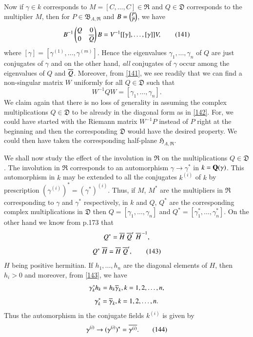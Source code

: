 Now if $\gamma\in k$ corresponds to $M=[C,\ldots,C]\in\mathfrak{R}$
and $Q\in\mathfrak{D}$ corresponds to the multiplier $M$, then for
$P\in\mathfrak{B}_{A,\mathfrak{R}}$ and $B=\binom{P}{\overline{P}}$, we have
\begin{equation*}
B^{-1}
\begin{pmatrix}
Q &  0\\
0 & \overline{Q}
\end{pmatrix}
B=V^{-1}[[\gamma],\ldots,[\gamma]]V,\tag{141}\label{141}
\end{equation*}
where $[\gamma]=[\gamma^{(1)},\ldots,\gamma^{(m)}]$. Hence the
eigenvalues $\gamma_{1},\ldots,\gamma_{n}$ of $Q$ are just conjugates
of $\gamma$ and on the other hand, {\em all} conjugates of $\gamma$
occur among the eigenvalues of $Q$ and $\overline{Q}$. Moreover, from
\eqref{141}, we see readily that we can find a non-singular matrix $W$
uniformly for all $Q\in\mathfrak{D}$ such that
\begin{equation*}
W^{-1}QW=[\gamma_{1},\ldots,\gamma_{n}].\tag{142}\label{142}
\end{equation*}
We claim again that there is no loss of generality in assuming the
complex multiplications $Q\in\mathfrak{D}$ to be already in the
diagonal form as in \eqref{142}. For, we could have started with the
Riemann matrix $W^{-1}P$ instead of $P$ right at the beginning and
then the corresponding $\mathfrak{D}$ would have the desired
property. We could then have taken the corresponding half-plane
$\mathfrak{H}_{A,\mathfrak{R}}$.

We shall now study the effect of the involution in $\mathfrak{R}$ on
the multiplications $Q\in\mathfrak{D}$. The involution in
$\mathfrak{R}$ corresponds to an automorphism $\gamma\to
\gamma^{\ast}$ in $k=\mathbf{Q}(\gamma)$. This automorphism in $k$ may be
extended to all the conjugates $k^{(i)}$ of $k$ by prescription
$(\gamma^{(i)})^{\ast}=(\gamma^{\ast})^{(i)}$. Thus, if $M$,
$M^{\ast}$ are the multipliers in $\mathfrak{R}$ corresponding to
$\gamma$ and $\gamma^{\ast}$ respectively, in $k$ and $Q$, $Q^{\ast}$
are the corresponding complex multiplications in $\mathfrak{D}$ then
$Q=[\gamma_{1},\ldots,\gamma_{n}]$ and
$Q^{\ast}=[\gamma^{\ast}_{1},\ldots,\gamma^{\ast}_{n}]$. On the other
hand we know from p.\@ 173 that 
$$
Q^{\ast}=\overline{H} \; \overline{Q}' \; {\overline{H}}^{ \, -1},
$$\pageoriginale
\ie
\begin{equation*}
Q^{\ast} \; \overline{H} = \overline{H} \; \overline{Q}',\tag{143}\label{143}
\end{equation*}
$H$ being positive hermitian. If $h_{1},\ldots,h_{n}$ are the diagonal
elements of $H$, then $h_{i}>0$ and moreover, from \eqref{143}, we
have
$$
\gamma^{\ast}_{k}h_{k}=h_{k}\overline{\gamma}_{k}, k=1,2,\ldots,n,
$$
\ie
$$
\gamma^{\ast}_{k}=\overline{\gamma}_{k},k=1,2,\ldots,n.
$$
Thus the automorphism in the conjugate fields $k^{(i)}$ is given by
\begin{equation*}
\gamma^{(i)}\to (\gamma^{(i)})^{\ast}=\overline{\gamma^{(i)}}.\tag{144}\label{144}
\end{equation*} 

